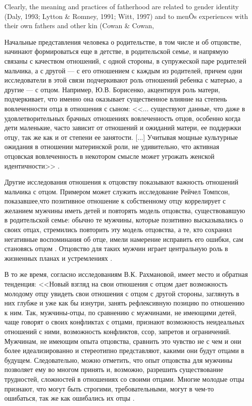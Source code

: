 \documentclass{../../common/thesisbyxetex}
\begin{document}
Clearly, the meaning and practices of fatherhood
are related to gender identity (Daly, 1993; Lytton \&
Romney, 1991; Witt, 1997) and to menÕs experiences
with their own fathers and other kin (Cowan \& Cowan,
\cite[131]{f21}

Начальные представления человека о родительстве, в том числе и об отцовстве, начинают формироваться 
еще в детстве, в родительской семье, и напрямую связаны с качеством отношений, с одной стороны, в 
супружеской паре родителей мальчика, а с другой --- с его отношением с каждым из родителей, причем 
одни исследователи в этой связи подчеркивают роль отношений ребенка с матерью, а другие --- с 
отцом. Например, Ю.В. Борисенко, акцентируя роль матери, подчеркивает, что именно она оказывает 
существенное влияние на степень вовлеченности отца в отношения с сыном: <<... существуют 
данные, что даже в удовлетворительных брачных отношениях вовлеченность отцов, особенно когда дети 
маленькие, часто зависит от отношений и ожиданий матери, ее поддержки отцу, так же как и от степени 
ее занятости. [...]  Учитывая мощные культурные ожидания в отношении материнской роли, не 
удивительно, что активная отцовская вовлеченность в некотором смысле может угрожать женской 
идентичности>> \cite[115]{psyot}.

Другие исследования отношения к отцовству показывают важность отношений мальчика с 
отцом. Примером может служить исследование Рейчел Томпсон, показавшее,что позитивное отношение к 
собственному отцу коррелирует с желанием мужчины иметь детей и повторять модель отцовства, 
существовавшую в родительской семье: обычно те мужчины, которые позитивно высказывались о 
своих отцах, стремились повторить эту модель отцовства, а те, кто сохранил негативные 
воспоминания об отце, имели намерение исправить его ошибки, сам становясь отцом  \cite[161]{imaf}.  
Отцовство для таких мужчин играет центральную роль в жизненных 
планах и устремлениях \cite{imaf}. 

В то же время, согласно исследованиям В.К. Рахмановой, имеет место и обратная тенденция: <<Новый 
взгляд на свои отношения с отцом дает возможность молодому отцу увидеть свои отношения с отцом с 
другой стороны, заглянуть в них глубже и уже как бы изнутри, занять рефлексивную позицию по 
отношению 
к ним. Так, мужчины-отцы, по сравнению с мужчинами, не имеющими детей, чаще говорят о своих 
конфликтах с отцами, признают возможность неидеальных отношений с ними, возможность конфликтов, 
ссор, запретов и ограничений. Мужчинам, не имеющим опыта отцовства, сравнить это чувство не с чем и 
они более идеализированно и стереотипно представляют, какими они будут отцами в будущем. 
Следовательно, можно отметить, что опыт отцовства для мужчины позволяет ему во многом принять и, 
возможно, разрешить существование трудностей, сложностей в отношениях со своими отцами. Многие 
молодые отцы признают, что могут быть строгими, требовательными, могут в чем-то ошибаться, так же 
как 
ошибались их отцы \cite[54]{relot}.
\end{document}
